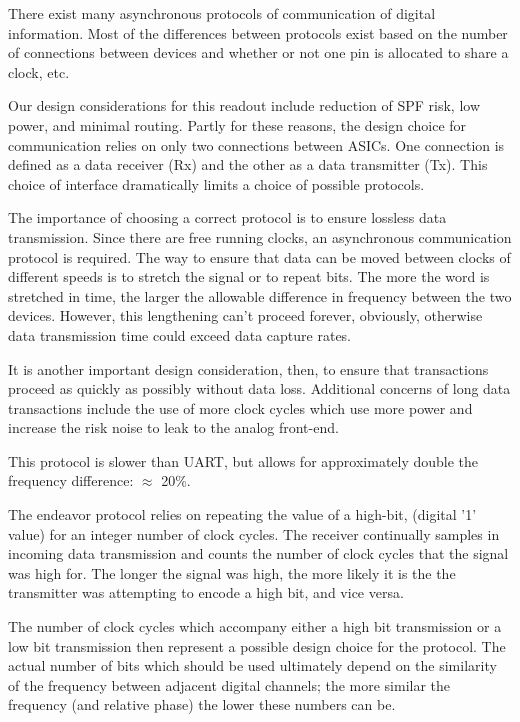 There exist many asynchronous protocols of communication of digital information.
Most of the differences between protocols exist based on the number of connections between devices and whether or not one pin is allocated to share a clock, etc.

Our design considerations for this readout include reduction of SPF risk, low power, and minimal routing.
Partly for these reasons, the design choice for communication relies on only two connections between ASICs.
One connection is defined as a data receiver (Rx) and the other as a data transmitter (Tx).
This choice of interface dramatically limits a choice of possible protocols.

The importance of choosing a correct protocol is to ensure lossless data transmission.
Since there are free running clocks, an asynchronous communication protocol is required.
The way to ensure that data can be moved between clocks of different speeds is to stretch the signal or to repeat bits.
The more the word is stretched in time, the larger the allowable difference in frequency between the two devices.
However, this lengthening can't proceed forever, obviously, otherwise data transmission time could exceed data capture rates.

It is another important design consideration, then, to ensure that transactions proceed as quickly as possibly without data loss.
Additional concerns of long data transactions include the use of more clock cycles which use more power and increase the risk noise to leak to the analog front-end.

This protocol is slower than UART, but allows for approximately double the frequency difference: $\approx$ 20\%.

The endeavor protocol relies on repeating the value of a high-bit, (digital '1' value) for an integer number of clock cycles.
The receiver continually samples in incoming data transmission and counts the number of clock cycles that the signal was high for.
The longer the signal was high, the more likely it is the the transmitter was attempting to encode a high bit, and vice versa.

The number of clock cycles which accompany either a high bit transmission or a low bit transmission then represent a possible design choice for the protocol.
The actual number of bits which should be used ultimately depend on the similarity of the frequency between adjacent digital channels; the more similar the frequency (and relative phase) the lower these numbers can be.


